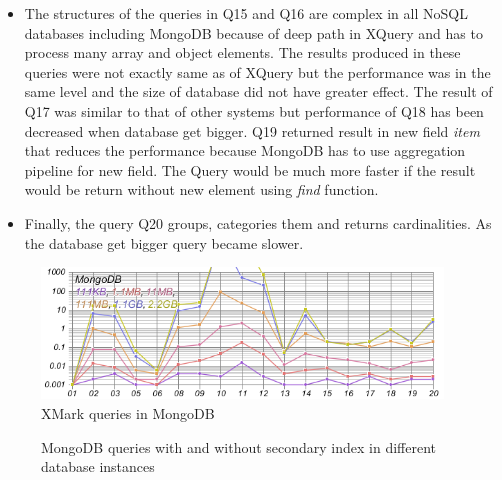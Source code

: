 \begin{itemize}
\item The structures of the queries in Q15 and Q16 are complex in all NoSQL databases including MongoDB because of deep path in XQuery and has to process many array and object elements. The results produced in these queries were not exactly same as of XQuery but the performance was in the same level and the size of database did not have greater effect. The result of Q17 was similar to that of other systems but performance of Q18 has been decreased when database get bigger. 
Q19 returned result in new field \textit{item} that reduces the performance because  MongoDB has to use aggregation pipeline for new field.  The Query would be much more faster if the result would be return without new element using \textit{find} function. 
\item Finally, the query Q20 groups, categories them and returns cardinalities. As the database get bigger query became slower. 
\end{itemize}
\begin{figure}
	\centering
	\includegraphics[width=0.95\textwidth]{img/result/mongodb/mongodb-all}
	\caption{XMark queries in MongoDB}
	\label{fig:xmark-result-mongodb-all}
	
\end{figure}	
\begin{figure}
	\centering
	\centering
	\caption{MongoDB queries with and without secondary index in different database instances}
	\label{fig:xmark-mongodb-index-noindex}
\end{figure}

